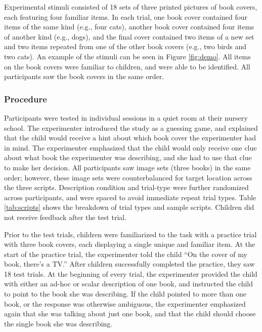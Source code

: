 \documentclass[man]{apa2}
\begin{document}
Experimental stimuli consisted of 18 sets of three printed pictures of book covers, each featuring four familiar items. In each trial, one book cover contained four items of the same kind (e.g., four cats), another book cover contained four items of another kind (e.g., dogs), and the final cover contained two items of a new set and two items repeated from one of the other book covers (e.g., two birds and two cats). An example of the stimuli can be seen in Figure \ref{fig:demo}. All items on the book covers were familiar to children, and were able to be identified. All participants saw the book covers in the same order.

\subsubsection{Procedure}

Participants were tested in individual sessions in a quiet room at their nursery school. The experimenter introduced the study as a guessing game, and explained that the child would receive a hint about which book cover the experimenter had in mind. The experimenter emphasized that the child would only receive one clue about what book the experimenter was describing, and she had to use that clue to make her decision. All participants saw image sets (three books) in the same order; however, these image sets were counterbalanced for target location across the three scripts. Description condition and trial-type were further randomized across participants, and were spaced to avoid immediate repeat trial types. Table \ref{tab:scripts} shows the breakdown of trial types and sample scripts. Children did not receive feedback after the test trial.

Prior to the test trials, children were familiarized to the task with a practice trial with three book covers, each displaying a single unique and familiar item. At the start of the practice trial, the experimenter told the child ``On the cover of my book, there's a TV.'' After children successfully completed the practice, they saw 18 test trials. At the beginning of every trial, the experimenter provided the child with either an ad-hoc or scalar description of one book, and instructed the child to point to the book she was describing. If the child pointed to more than one book, or the response was otherwise ambiguous, the experimenter emphasized again that she was talking about just one book, and that the child should choose the single book she was describing.
\end{document}
